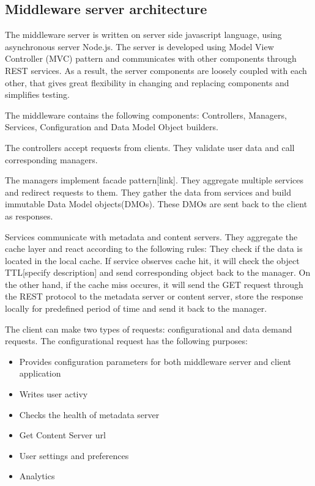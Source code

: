

\subsection{Middleware server architecture}

The middleware server is written on server side javascript language, using asynchronous server Node.js. The server is developed using Model View Controller (MVC) pattern and communicates with other components through REST services. As a result, the server components are loosely coupled with each other, that gives great flexibility in changing and replacing components and simplifies testing. 

The middleware contains the following components: Controllers, Managers, Services, Configuration and Data Model Object builders. 

The controllers accept requests from clients. They validate user data and call corresponding managers.

The managers implement facade pattern[link]. They aggregate multiple services and redirect requests to them. They gather the data from services and build immutable Data Model objects(DMOs). These DMOs are sent back to the client as responses.

Services communicate with metadata and content servers. They aggregate the cache layer and react according to the following rules:
They check if the data is located in the local cache. If service observes cache hit, it will check the object TTL[specify description] and send corresponding object back to the manager. On the other hand, if the cache miss occures, it will send the GET request through the REST protocol to the metadata server or content server, store the response locally for predefined period of time and send it back to the manager.

The client can make two types of requests: configurational and data demand requests.
The configurational request has the following purposes:
\begin{itemize}
	\item Provides configuration parameters for both middleware server and client application
	\item Writes user activy
	\item Checks the health of metadata server
	\item Get Content Server url
	\item User settings and preferences
	\item Analytics
\end{itemize}

